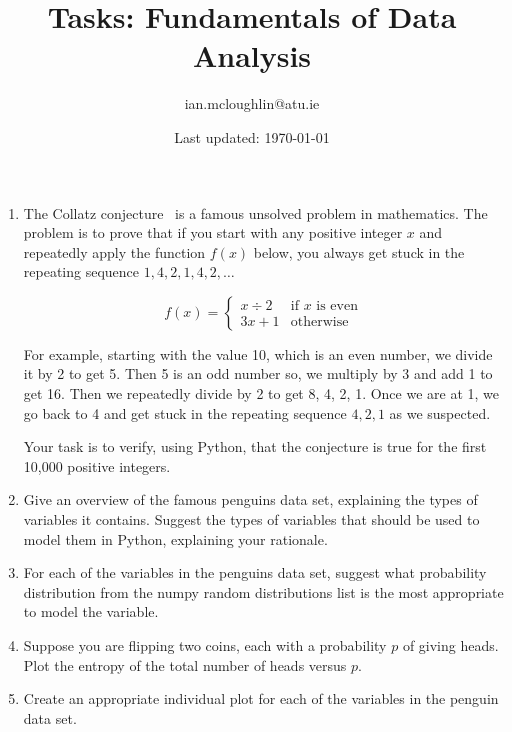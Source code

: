 \documentclass{iansnotes}
\title{Tasks: Fundamentals of Data Analysis}
\author{ian.mcloughlin@atu.ie}
\date{Last updated: \today}
\begin{document}
 
\maketitle
 
\begin{enumerate}

  \item The Collatz conjecture~\autocite{quantacollatz} is a famous unsolved problem in mathematics. The problem is to prove that if you start with any positive integer $x$ and repeatedly apply the function $f(x)$ below, you always get stuck in the repeating sequence $1,4,2,1,4,2,\ldots$ 
  
  $$ f(x) = \begin{cases}
    x \div 2 & \text{if } x \text{ is even} \\
    3x + 1              & \text{otherwise} 
  \end{cases}$$
 
  For example, starting with the value 10, which is an even number, we divide it by 2 to get 5.
  Then 5 is an odd number so, we multiply by 3 and add 1 to get 16.
  Then we repeatedly divide by 2 to get 8, 4, 2, 1.
  Once we are at 1, we go back to 4 and get stuck in the repeating sequence $4, 2, 1$ as we suspected.

  Your task is to verify, using Python, that the conjecture is true for the first 10,000 positive integers.
  
  \item Give an overview of the famous penguins data set\autocite{penguinscsv}, explaining the types of variables it contains. Suggest the types of variables that should be used to model them in Python, explaining your rationale.

  \item For each of the variables in the penguins data set\autocite{penguinscsv}, suggest what probability distribution from the numpy random distributions list is the most appropriate to model the variable\autocite{numpyrandomdistributions}.

  \item Suppose you are flipping two coins, each with a probability $p$ of giving heads. Plot the entropy of the total number of heads versus $p$.

  \item Create an appropriate individual plot for each of the variables in the penguin data set\autocite{penguinscsv}.

\end{enumerate}
\end{document}
